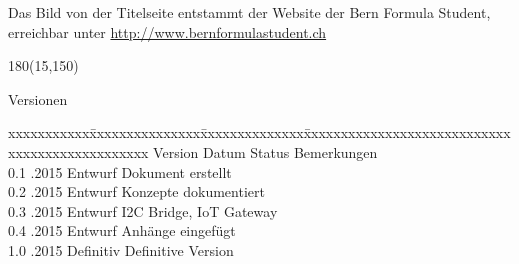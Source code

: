 \color{black}
Das Bild von der Titelseite entstammt der Website der Bern Formula Student, erreichbar unter \url{http://www.bernformulastudent.ch}

\begin{textblock}{180}(15,150)
\color{black}
\begin{huge}
Versionen
\end{huge}
\vspace{10mm}

\fontsize{10pt}{18pt}\selectfont
\begin{tabbing}
xxxxxxxxxxx\=xxxxxxxxxxxxxxx\=xxxxxxxxxxxxxx\=xxxxxxxxxxxxxxxxxxxxxxxxxxxxxxxxxxxxxxxxxxxxxxx \kill
Version	\> Datum	\> Status		\> Bemerkungen		\\
0.1	.2015	\> Entwurf		\> Dokument erstellt	\\	
0.2	.2015	\> Entwurf		\> Konzepte dokumentiert	\\ 
0.3	.2015	\> Entwurf		\> I2C Bridge, IoT Gateway	\\ 
0.4	.2015	\> Entwurf		\> Anhänge eingefügt	\\ 
1.0	.2015	\> Definitiv	\> Definitive Version	\\ 
\end{tabbing}

\end{textblock}
